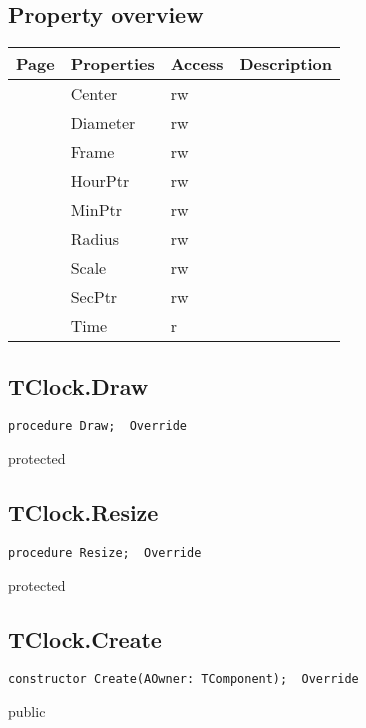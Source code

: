 \subsection{Property overview}
\label{hmi:retroclock:tclock:properties}
\begin{tabularx}{\textwidth}{lllX}
Page & Properties & Access & Description \\ \hline
\pageref{hmi:retroclock:tclock:center} & Center & rw &  \\
\pageref{hmi:retroclock:tclock:diameter} & Diameter & rw &  \\
\pageref{hmi:retroclock:tclock:frame} & Frame & rw &  \\
\pageref{hmi:retroclock:tclock:hourptr} & HourPtr & rw &  \\
\pageref{hmi:retroclock:tclock:minptr} & MinPtr & rw &  \\
\pageref{hmi:retroclock:tclock:radius} & Radius & rw &  \\
\pageref{hmi:retroclock:tclock:scale} & Scale & rw &  \\
\pageref{hmi:retroclock:tclock:secptr} & SecPtr & rw &  \\
\pageref{hmi:retroclock:tclock:time} & Time & r &  \\
\hline
\end{tabularx}
\subsection{TClock.Draw}
\label{hmi:retroclock:tclock:draw}
\begin{FPCList}
\Declaration 

\begin{verbatim}
procedure Draw;  Override
\end{verbatim}
\Visibility
protected
\end{FPCList}
\subsection{TClock.Resize}
\label{hmi:retroclock:tclock:resize}
\begin{FPCList}
\Declaration 

\begin{verbatim}
procedure Resize;  Override
\end{verbatim}
\Visibility
protected
\end{FPCList}
\subsection{TClock.Create}
\label{hmi:retroclock:tclock:create}
\begin{FPCList}
\Declaration 

\begin{verbatim}
constructor Create(AOwner: TComponent);  Override
\end{verbatim}
\Visibility
public
\end{FPCList}
